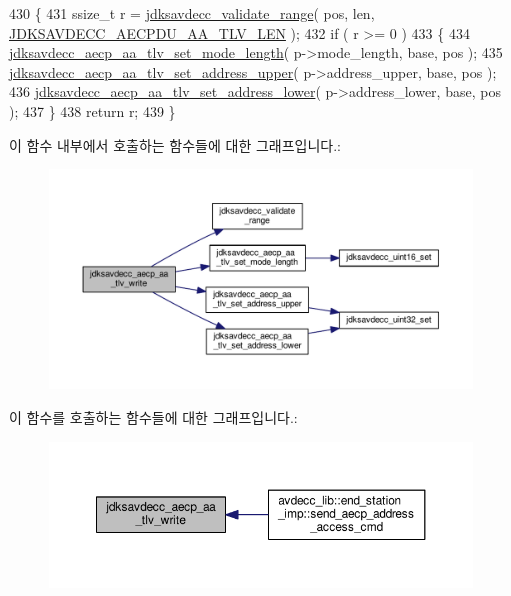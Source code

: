 \begin{DoxyCode}
430 \{
431     ssize\_t r = \hyperlink{group__util_ga9c02bdfe76c69163647c3196db7a73a1}{jdksavdecc\_validate\_range}( pos, len, 
      \hyperlink{group___a_e_c_p___a_a__tlv_ga8c9adb511e50d7ed81e30527a0f86d5b}{JDKSAVDECC\_AECPDU\_AA\_TLV\_LEN} );
432     \textcolor{keywordflow}{if} ( r >= 0 )
433     \{
434         \hyperlink{group__aecp__aa__tlv_ga9d477a8f40223f0f2769743ebaeada3e}{jdksavdecc\_aecp\_aa\_tlv\_set\_mode\_length}( p->mode\_length, base,
       pos );
435         \hyperlink{group__aecp__aa__tlv_ga86a4c9467c75ebb6f721637d414097dd}{jdksavdecc\_aecp\_aa\_tlv\_set\_address\_upper}( p->address\_upper,
       base, pos );
436         \hyperlink{group__aecp__aa__tlv_ga9fd8f39fee9c3ddc79b29e4b16681a1e}{jdksavdecc\_aecp\_aa\_tlv\_set\_address\_lower}( p->address\_lower,
       base, pos );
437     \}
438     \textcolor{keywordflow}{return} r;
439 \}
\end{DoxyCode}


이 함수 내부에서 호출하는 함수들에 대한 그래프입니다.\+:
\nopagebreak
\begin{figure}[H]
\begin{center}
\leavevmode
\includegraphics[width=350pt]{group__aecp__aa__tlv_ga6540f6de6d7c49a5455ac50128be2dba_cgraph}
\end{center}
\end{figure}




이 함수를 호출하는 함수들에 대한 그래프입니다.\+:
\nopagebreak
\begin{figure}[H]
\begin{center}
\leavevmode
\includegraphics[width=350pt]{group__aecp__aa__tlv_ga6540f6de6d7c49a5455ac50128be2dba_icgraph}
\end{center}
\end{figure}


